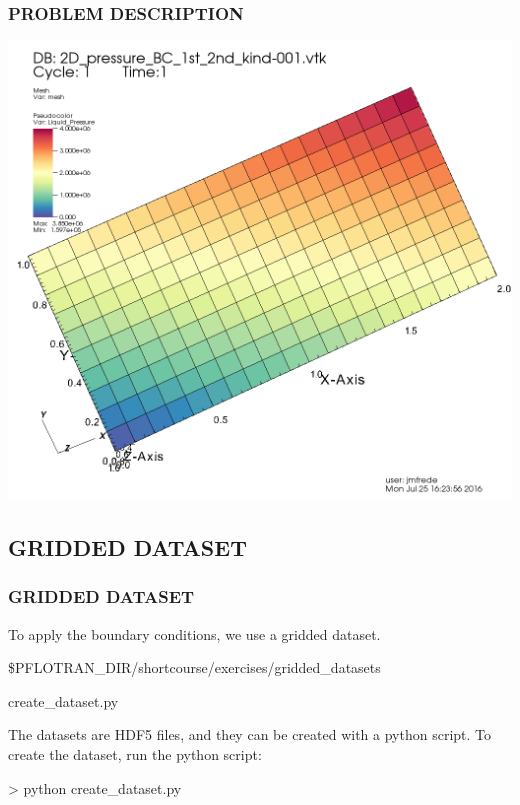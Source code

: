 \documentclass{beamer}
\begin{document}
\begin{frame}\frametitle{PROBLEM DESCRIPTION}

\includegraphics[width=0.75\textheight]{./visit_figure.png}

\end{frame}

\subsection{GRIDDED DATASET}

\begin{frame}\frametitle{GRIDDED DATASET}

To apply the boundary conditions, we use a gridded dataset.

\begin{semiverbatim}
\$PFLOTRAN_DIR/shortcourse/exercises/gridded_datasets

create_dataset.py
\end{semiverbatim}

The datasets are HDF5 files, and they can be created with a python script.
To create the dataset, run the python script:

\begin{semiverbatim}
> python create_dataset.py
\end{semiverbatim}

\end{frame}
\end{document}
